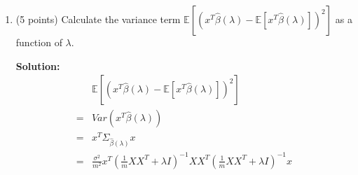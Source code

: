\documentclass[twoside,10pt]{article}
\begin{document}
\begin{enumerate}
\begin{enumerate}
\item (5 points) Calculate the variance term $\mathbb E\left[\left(x^T {\hat \beta}(\lambda) - \mathbb E[x^T {\hat \beta}(\lambda)] \right)^2\right]$ as a function of $\lambda$.
\begin{tcolorbox}
\textbf{Solution:}
\begin{align*}
& \mathbb E\left[\left(x^T {\hat \beta}(\lambda) - \mathbb E[x^T {\hat \beta}(\lambda)] \right)^2\right] \\
= &  Var \left(x^T {\hat \beta}(\lambda)\right) \\
= & x^T \Sigma_{{\hat \beta}(\lambda)} x \\
= &  \frac {\sigma^2} {m^2} x^T \left( \frac 1 m XX^T + \lambda I \right)^{-1}  XX^T  \left( \frac 1 m XX^T + \lambda I \right)^{-1}  x
\end{align*}
\end{tcolorbox}


\end{enumerate}
\end{enumerate}
\end{document}
